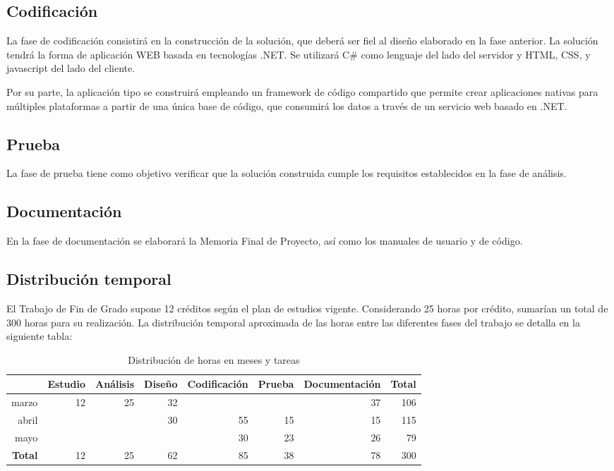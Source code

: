\subsection{Codificación}
La fase de codificación consistirá en la construcción de la solución, que deberá ser fiel al diseño elaborado en la fase anterior. La solución tendrá la forma de aplicación WEB basada en tecnologías .NET. Se utilizará C\string# como lenguaje del lado del servidor y HTML, CSS, y javascript del lado del cliente.

Por su parte, la aplicación tipo se construirá empleando un framework de código compartido que permite crear aplicaciones nativas para múltiples plataformas a partir de una única base de código, que consumirá los datos a través de un servicio web basado en .NET.

\subsection{Prueba}
La fase de prueba tiene como objetivo verificar que la solución construida cumple los requisitos establecidos en la fase de análisis.

\subsection{Documentación}
En la fase de documentación se elaborará la Memoria Final de Proyecto, así como los manuales de usuario y de código.

\subsection{Distribución temporal}
El Trabajo de Fin de Grado supone 12 créditos según el plan de estudios vigente. Considerando 25 horas por crédito, sumarían un total de 300 horas para su realización. La distribución temporal aproximada de las horas entre las diferentes fases del trabajo se detalla en la siguiente tabla:

\begin{table}[h!]
    \centering
    \begin{tabular}{r|rrrrrr|r}
                       & Estudio & Análisis & Diseño & Codificación & Prueba & Documentación & \textbf{Total} \\
        \hline         
        marzo          &      12 &       25 &     32 &              &        &            37 &           106 \\
        abril          &         &          &     30 &           55 &     15 &            15 &           115 \\
        mayo           &         &          &        &           30 &     23 &            26 &            79 \\
        \hline
        \textbf{Total} &      12 &       25 &     62 &           85 &     38 &            78 &           300
    \end{tabular}
    \caption{Distribución de horas en meses y tareas}
\end{table}